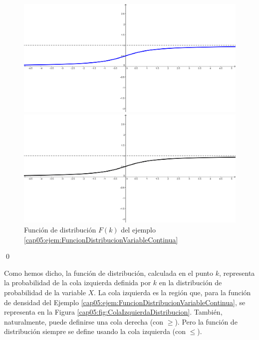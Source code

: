 \begin{ejemplo}
\begin{figure}[htb]
\begin{center}
\begin{enColor}
\includegraphics[width=12cm]{../fig/Cap05-FuncionDistribucionVariableCauchy.png}
\end{enColor}
\begin{bn}
\includegraphics[width=12cm]{../fig/Cap05-FuncionDistribucionVariableCauchy-bn.png}
\end{bn}
\caption{Función de distribución $F(k)$ del ejemplo \ref{cap05:ejem:FuncionDistribucionVariableContinua}}
\label{cap05:fig:FuncionDistribucionCauchy}
\end{center}
\end{figure}

\qed
\end{ejemplo}

Como hemos dicho, la función de distribución, calculada en el punto $k$, representa la probabilidad de la  cola izquierda definida por $k$ en la distribución de probabilidad de la variable $X$. La {\sf cola izquierda} es la región que, para la función de densidad del Ejemplo \ref{cap05:ejem:FuncionDistribucionVariableContinua}, se representa en la Figura \ref{cap05:fig:ColaIzquierdaDistribucion}. También, naturalmente, puede definirse una cola derecha (con $\geq$). Pero la función de distribución siempre se define usando la cola izquierda (con $\leq$).

